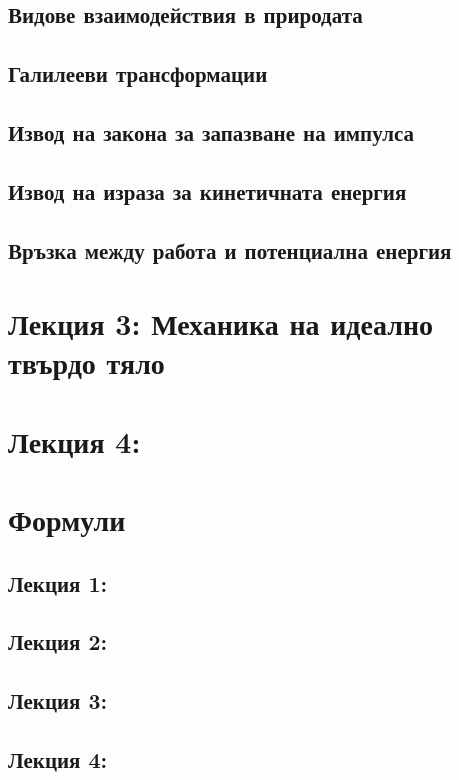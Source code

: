 \documentclass[fleqn]{article}
\begin{document}
\subsection{Видове взаимодействия в природата}

\subsection{Галилееви трансформации}

\subsection{Извод на закона за запазване на импулса}

\subsection{Извод на израза за кинетичната енергия}

\subsection{Връзка между работа и потенциална енергия}

\newpage
\section{Лекция 3: Механика на идеално твърдо тяло}

\newpage
\section{Лекция 4: }

\newpage
\section{Формули}

\subsection{Лекция 1:}

\subsection{Лекция 2:}

\subsection{Лекция 3: }

\subsection{Лекция 4: }
\end{document}
